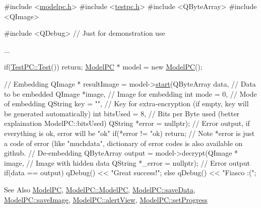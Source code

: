 \begin{DoxyCode}
\textcolor{preprocessor}{#include <\hyperlink{modelpc_8h}{modelpc.h}>}
\textcolor{preprocessor}{#include <\hyperlink{testpc_8h}{testpc.h}>}
\textcolor{preprocessor}{#include <QByteArray>}
\textcolor{preprocessor}{#include <QImage>}

\textcolor{preprocessor}{#include <QDebug>} \textcolor{comment}{// Just for demonstration use}

...

if(\hyperlink{class_test_p_c_adec99ddd8910d45b6aca0a105f44960e}{TestPC::Test}())
    \textcolor{keywordflow}{return};
\hyperlink{class_model_p_c}{ModelPC} * model = \textcolor{keyword}{new} \hyperlink{class_model_p_c}{ModelPC}();

\textcolor{comment}{// Embedding}
QImage * resultImage = model->\hyperlink{class_model_p_c_a3cae34fd5bcb06e8c1f8cfe7961bd270}{start}(QByteArray data, \textcolor{comment}{// Data to be embedded}
                                    QImage *image, \textcolor{comment}{// Image for embedding}
                                    \textcolor{keywordtype}{int} mode = 0, \textcolor{comment}{// Mode of embedding}
                                    QString key = \textcolor{stringliteral}{""}, \textcolor{comment}{// Key for extra-encryption (if empty, key will be
       generated automatically)}
                                    \textcolor{keywordtype}{int} bitsUsed = 8, \textcolor{comment}{// Bits per Byte used (better explaination
       ModelPC::bitsUsed)}
                                    QString *error = \textcolor{keyword}{nullptr}); \textcolor{comment}{// Error output, if everything is ok, error
       will be "ok"}
\textcolor{keywordflow}{if}(*error != \textcolor{stringliteral}{"ok)}
\textcolor{stringliteral}{    return;}
\textcolor{stringliteral}{// Note *error is just a code of error (like "}muchdata\textcolor{stringliteral}{", dictionary of error codes is also available on
       github.}
\textcolor{stringliteral}{}
\textcolor{stringliteral}{// De-embedding}
\textcolor{stringliteral}{QByteArray output = model->decrypt(QImage * image, // Image with hidden data}
\textcolor{stringliteral}{                                   QString *\_error = nullptr); // Error output}
\textcolor{stringliteral}{if(data == output)}
\textcolor{stringliteral}{   qDebug() << "}Great success!\textcolor{stringliteral}{";}
\textcolor{stringliteral}{else}
\textcolor{stringliteral}{   qDebug() << "}Fiasco :(\textcolor{stringliteral}{";}
\end{DoxyCode}
 \begin{DoxySeeAlso}{See Also}
\hyperlink{class_model_p_c}{Model\-P\-C}, \hyperlink{class_model_p_c_ae12ebe65ec973c02a0de4850a7c1e31c}{Model\-P\-C\-::\-Model\-P\-C}, \hyperlink{class_model_p_c_a0855107fb0ccc247cd9e893fae9bb08a}{Model\-P\-C\-::save\-Data}, \hyperlink{class_model_p_c_a41f5e2e8022679046e4d3fa1109025fa}{Model\-P\-C\-::save\-Image}, \hyperlink{class_model_p_c_af0217a7ca5671e26090dc50a5dccdaf5}{Model\-P\-C\-::alert\-View}, \hyperlink{class_model_p_c_afdcd80f0ed5062e145a71f09b0897547}{Model\-P\-C\-::set\-Progress}
\end{DoxySeeAlso}
